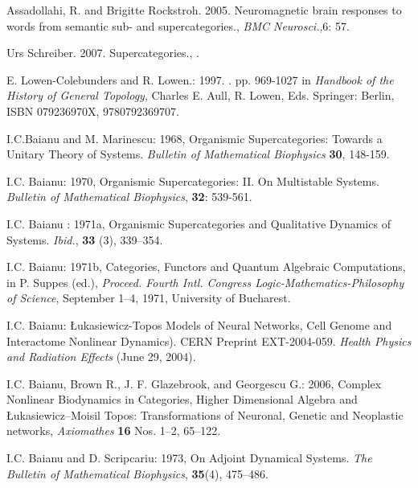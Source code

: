 \documentclass[12pt]{article}
\theoremstyle{plain}
\theoremstyle{definition}
\numberwithin{equation}{section}
\begin{document}
\begin{thebibliography}{99}
Assadollahi, R. and Brigitte Rockstroh. 2005. Neuromagnetic brain responses to words from semantic sub- and supercategories., {\em BMC Neurosci.},{6}: 57. 

Urs Schreiber. 2007. Supercategories., 
.

\bibitem{}
E. Lowen-Colebunders and R. Lowen.: 1997. 
.
 pp. 969-1027 in {\em Handbook of the History of General Topology},
Charles E. Aull, R. Lowen, Eds. Springer: Berlin, ISBN 079236970X, 9780792369707.

I.C.Baianu and M. Marinescu: 1968, Organismic Supercategories: Towards a Unitary Theory of Systems. \emph{Bulletin of Mathematical Biophysics} \textbf{30}, 148-159.

I.C. Baianu: 1970, Organismic Supercategories: II. On Multistable Systems. \emph{Bulletin of Mathematical Biophysics}, \textbf{32}: 539-561.

I.C. Baianu : 1971a, Organismic Supercategories and Qualitative Dynamics of Systems. \emph{Ibid.}, \textbf{33} (3), 339--354.

I.C. Baianu: 1971b, Categories, Functors and Quantum Algebraic Computations, in P. Suppes (ed.), \emph{Proceed. Fourth Intl. Congress Logic-Mathematics-Philosophy of Science}, September 1--4, 1971, University of Bucharest.

I.C. Baianu: \L ukasiewicz-Topos Models of Neural Networks, Cell Genome and Interactome Nonlinear Dynamics). CERN Preprint EXT-2004-059. \textit{Health Physics and Radiation Effects} (June 29, 2004). 

I.C. Baianu, Brown R., J. F. Glazebrook, and Georgescu G.: 2006, Complex Nonlinear Biodynamics in 
Categories, Higher Dimensional Algebra and \L ukasiewicz--Moisil Topos: Transformations of
Neuronal, Genetic and Neoplastic networks, \emph{Axiomathes} \textbf{16} Nos. 1--2, 65--122.

I.C. Baianu and D. Scripcariu: 1973, On Adjoint Dynamical Systems. \emph{The Bulletin of Mathematical Biophysics}, \textbf{35}(4), 475--486.


\end{thebibliography}
\end{document}
